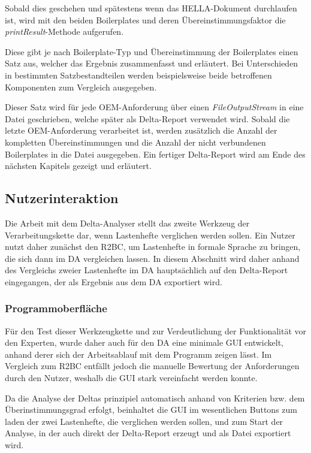 \documentclass[12pt]{report}
\begin{document}
Sobald dies geschehen und spätestens wenn das HELLA-Dokument durchlaufen ist, wird mit den beiden Boilerplates und deren Übereinstimmungsfaktor die \textit{printResult}-Methode aufgerufen. 

Diese gibt je nach Boilerplate-Typ und Übereinstimmung der Boilerplates einen Satz aus, welcher das Ergebnis zusammenfasst und erläutert. Bei Unterschieden in bestimmten Satzbestandteilen werden beispielsweise beide betroffenen Komponenten zum Vergleich ausgegeben. 

Dieser Satz wird für jede OEM-Anforderung über einen \textit{FileOutputStream} in eine Datei geschrieben, welche später als Delta-Report verwendet wird. Sobald die letzte OEM-Anforderung verarbeitet ist, werden zusätzlich die Anzahl der kompletten Übereinstimmungen und die Anzahl der nicht verbundenen Boilerplates in die Datei ausgegeben. Ein fertiger Delta-Report wird am Ende des nächsten Kapitels gezeigt und erläutert.
\subsection{Nutzerinteraktion}
Die Arbeit mit dem Delta-Analyser stellt das zweite Werkzeug der Verarbeitungskette dar, wenn Lastenhefte verglichen werden sollen. Ein Nutzer nutzt daher zunächst den R2BC, um Lastenhefte in formale Sprache zu bringen, die sich dann im DA vergleichen lassen. In diesem Abschnitt wird daher anhand des Vergleichs zweier Lastenhefte im DA hauptsächlich auf den Delta-Report eingegangen, der als Ergebnis aus dem DA exportiert wird. 

\subsubsection{Programmoberfläche}
Für den Test dieser Werkzeugkette und zur Verdeutlichung der Funktionalität vor den Experten, wurde daher auch für den DA eine minimale GUI entwickelt, anhand derer sich der Arbeitsablauf mit dem Programm zeigen lässt. Im Vergleich zum R2BC entfällt jedoch die manuelle Bewertung der Anforderungen durch den Nutzer, weshalb die GUI stark vereinfacht werden konnte.

Da die Analyse der Deltas prinzipiel automatisch anhand von Kriterien bzw. dem Überinstimmungsgrad erfolgt, beinhaltet die GUI im wesentlichen Buttons zum laden der zwei Lastenhefte, die verglichen werden sollen, und zum Start der Analyse, in der auch direkt der Delta-Report erzeugt und als Datei exportiert wird.
\end{document}
